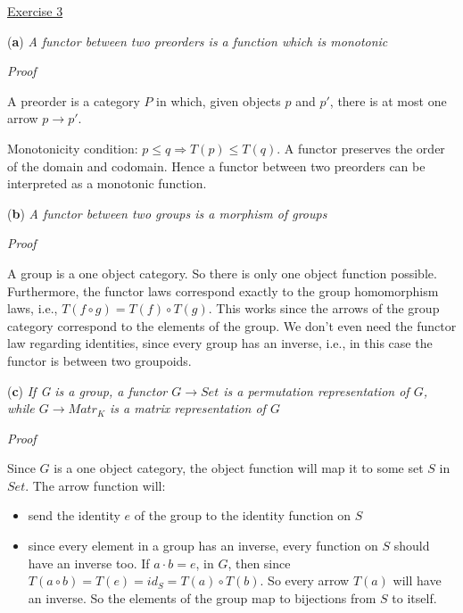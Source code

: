 \noindent
\underline{Exercise 3}
\vspace{2mm}

(\textbf{a}) \emph{A functor between two preorders is a function which is monotonic}

\vspace{2mm}

\noindent
\emph{Proof}

A preorder is a category $P$ in which, given objects $p$ and $p'$, there is at most one arrow $p \rightarrow p'$.

Monotonicity condition: $p \leq q \Longrightarrow T(p) \leq T(q)$. A functor preserves the order of the domain and codomain. Hence a functor between two preorders can be interpreted as a monotonic function. 

\vspace{2mm}
(\textbf{b}) \emph{A functor between two groups is a morphism of groups}

\vspace{2mm}
\noindent
\emph{Proof}

A group is a one object category. So there is only one object function possible. Furthermore, the functor laws correspond exactly to the group homomorphism laws, i.e., $T(f \circ g) = T(f) \circ T(g)$. This works since the arrows of the group category correspond to the elements of the group. We don't even need the functor law regarding identities, since every group has an inverse, i.e., in this case the functor is between two groupoids. 

\vspace{2mm}
(\textbf{c}) \emph{If G is a group, a functor $G \rightarrow Set$ is a permutation representation
of $G$, while $G \rightarrow Matr_K$ is a matrix representation of $G$}

\vspace{2mm}
\noindent
\emph{Proof}

Since $G$ is a one object category, the object function will map it to some set $S$ in $Set$. The arrow function will: 
\begin{itemize}
	\item send the identity $e$ of the group to the identity function on $S$
	\item since every element in a group has an inverse, every function on $S$ should have an inverse too. If $a \cdot b = e$, in $G$, then since $T(a \circ b) = T(e) = id_S = T(a) \circ T(b)$. So every arrow $T(a)$ will have an inverse. So the elements of the group map to bijections from $S$ to itself.  
\end{itemize}

